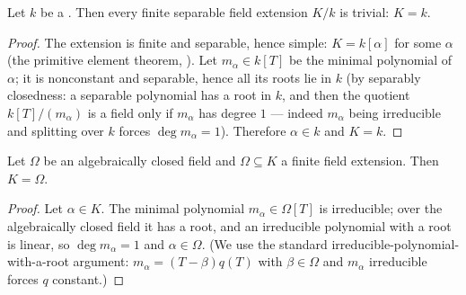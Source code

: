 \begin{lemma}
\label{lem:pc-sepclosed-finite-sep-trivial}
Let $k$ be a .
Then every finite separable field extension $K/k$ is trivial: $K=k$.
\end{lemma}
\begin{proof}
The extension is finite and separable, hence simple: $K=k[\alpha]$ for some
$\alpha$ (the primitive element theorem, ).  Let $m_\alpha\in k[T]$ be
the minimal polynomial of $\alpha$; it is nonconstant and separable, hence
all its roots lie in $k$ (by separably closedness: a separable polynomial
has a root in $k$, and then the quotient $k[T]/(m_\alpha)$ is a field only
if $m_\alpha$ has degree $1$ — indeed $m_\alpha$ being irreducible and
splitting over $k$ forces $\deg m_\alpha=1$).  Therefore $\alpha\in k$ and
$K=k$.
\end{proof}
\begin{lemma}
\label{lem:pc-finite-extension-alg-closed}
Let $\Omega$ be an algebraically closed field and $\Omega\subseteq K$ a
finite field extension.  Then $K=\Omega$.
\end{lemma}
\begin{proof}
Let $\alpha\in K$.  The minimal polynomial $m_\alpha\in\Omega[T]$ is
irreducible; over the algebraically closed field it has a root, and an
irreducible polynomial with a root is linear, so $\deg m_\alpha=1$ and
$\alpha\in\Omega$.  (We use the standard irreducible-polynomial-with-a-root
argument: $m_\alpha=(T-\beta)q(T)$ with $\beta\in\Omega$ and $m_\alpha$
irreducible forces $q$ constant.)
\end{proof}

